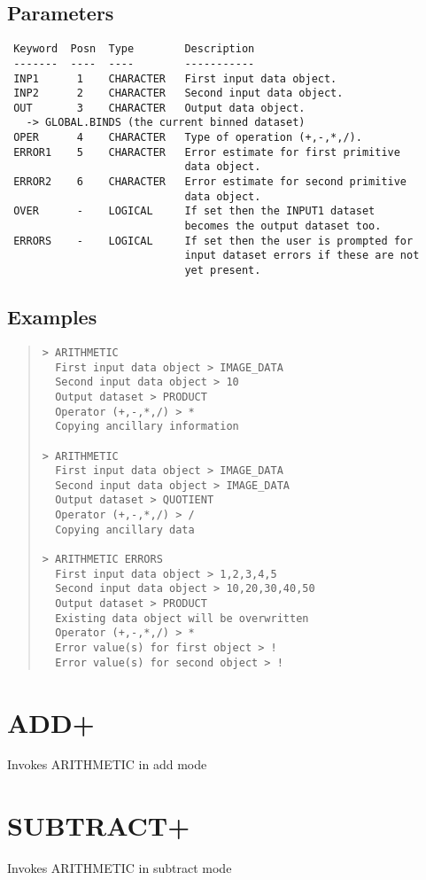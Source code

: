 \documentclass{book}
\renewcommand{\_}{{\tt\char'137}}     %
\begin{document}
\subsection{Parameters}
\begin{verbatim}
 Keyword  Posn  Type        Description
 -------  ----  ----        -----------
 INP1      1    CHARACTER   First input data object.
 INP2      2    CHARACTER   Second input data object.
 OUT       3    CHARACTER   Output data object.
   -> GLOBAL.BINDS (the current binned dataset)
 OPER      4    CHARACTER   Type of operation (+,-,*,/).
 ERROR1    5    CHARACTER   Error estimate for first primitive
                            data object.
 ERROR2    6    CHARACTER   Error estimate for second primitive
                            data object.
 OVER      -    LOGICAL     If set then the INPUT1 dataset
                            becomes the output dataset too.
 ERRORS    -    LOGICAL     If set then the user is prompted for
                            input dataset errors if these are not
                            yet present.

\end{verbatim}\subsection{Examples}
\begin{quote}\begin{verbatim}
> ARITHMETIC
  First input data object > IMAGE_DATA
  Second input data object > 10
  Output dataset > PRODUCT
  Operator (+,-,*,/) > *
  Copying ancillary information

> ARITHMETIC
  First input data object > IMAGE_DATA
  Second input data object > IMAGE_DATA
  Output dataset > QUOTIENT
  Operator (+,-,*,/) > /
  Copying ancillary data

> ARITHMETIC ERRORS
  First input data object > 1,2,3,4,5
  Second input data object > 10,20,30,40,50
  Output dataset > PRODUCT
  Existing data object will be overwritten
  Operator (+,-,*,/) > *
  Error value(s) for first object > !
  Error value(s) for second object > !
\end{verbatim}\end{quote}
\section{ADD+}
Invokes ARITHMETIC in add mode
\section{SUBTRACT+}
Invokes ARITHMETIC in subtract mode
\end{document}
